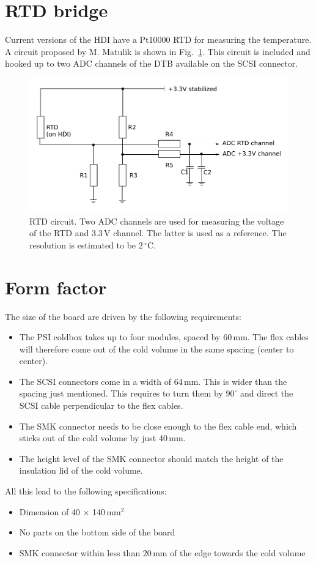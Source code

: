\section{RTD bridge}
Current versions of the HDI have a Pt10000 RTD for measuring the temperature. A circuit proposed by M. Matulik is shown in Fig.~\ref{fig:RTDcircuit}. This circuit is included and hooked up to two ADC channels of the DTB available on the SCSI connector.

\begin{figure}[hbtp]
	\begin{center}
	\includegraphics[width=.7\textwidth]{img/RTDcircuit.pdf}
	\end{center}
	\caption{RTD circuit. Two ADC channels are used for measuring the voltage of the RTD and 3.3\,V channel. The latter is used as a reference. The resolution is estimated to be $2\,^\circ$C.}
	\label{fig:RTDcircuit}
\end{figure}


\section{Form factor}

The size of the board are driven by the following requirements:
\begin{itemize}
    \item The PSI coldbox takes up to four modules, spaced by 60\,mm. The flex cables will therefore come out of the cold volume in the same spacing (center to center).
    \item The SCSI connectors come in a width of 64\,mm. This is wider than the spacing just mentioned. This requires to turn them by $90^\circ$ and direct the SCSI cable perpendicular to the flex cables.
    \item The SMK connector needs to be close enough to the flex cable end, which sticks out of the cold volume by just 40\,mm.
    \item The height level of the SMK connector should match the height of the insulation lid of the cold volume.
\end{itemize}
All this lead to the following specifications:
\begin{itemize}
    \item Dimension of 40 $\times$ 140\,mm$^2$
    \item No parts on the bottom side of the board
    \item SMK connector within less than 20\,mm of the edge towards the cold volume
\end{itemize}

